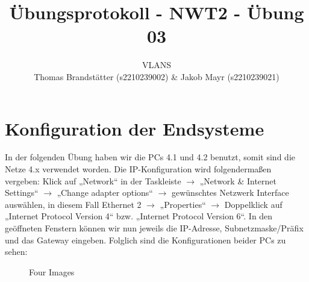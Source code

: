 \documentclass{article}
\title{Übungsprotokoll - NWT2 - Übung 03}
\author{\vspace{0.5cm} \Large VLANS\\ Thomas Brandstätter (s2210239002) \& Jakob Mayr (s2210239021)}
\begin{document}
\maketitle

\section{Konfiguration der Endsysteme}

In der folgenden Übung haben wir die PCs 4.1 und 4.2 benutzt, somit sind die Netze 4.x verwendet worden. Die IP-Konfiguration wird folgendermaßen vergeben: Klick auf „Network“ in der Taskleiste $\rightarrow$ „Network \& Internet Settings“ $\rightarrow$ „Change adapter options“ $\rightarrow$ gewünschtes Netzwerk Interface auswählen, in diesem Fall Ethernet 2 $\rightarrow$ „Properties“ $\rightarrow$ Doppelklick auf „Internet Protocol Version 4“ bzw. „Internet Protocol Version 6“. In den geöffneten Fenstern können wir nun jeweils die IP-Adresse, Subnetzmaske/Präfix und das Gateway eingeben. Folglich sind die Konfigurationen beider PCs zu sehen:

\begin{figure}[ht]
  \centering
  \caption{Four Images}
  \label{fig:four_images}
\end{figure}
\end{document}
